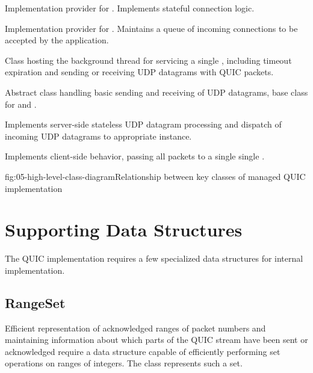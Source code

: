 \begin{itemize}

  \litem[]{\ManagedQuicConnection{}} Implementation provider for \QuicConnection{}. Implements
stateful connection logic.

  \litem[]{\ManagedQuicListener{}} Implementation provider for \QuicListener{}. Maintains a queue of
incoming connections to be accepted by the application.

  \litem[]{\QuicConnectionContext{}} Class hosting the background thread for servicing a single
\ManagedQuicConnection{}, including timeout expiration and sending or receiving UDP datagrams with
QUIC packets.

  \litem[]{\QuicSocketContext{}} Abstract class handling basic sending and receiving of UDP
datagrams, base class for \QuicClientSocketContext{} and \QuicServerSocketContext{}.

  \litem[]{\QuicServerSocketContext{}} Implements server-side stateless UDP datagram processing and
dispatch of incoming UDP datagrams to appropriate \QuicConnectionContext{} instance.

  \litem[]{\QuicClientSocketContext{}} Implements client-side \QuicSocketContext{} behavior, passing
all packets to a single single \QuicConnectionContext{}.

\end{itemize}

\begin{myFigure}{fig:05-high-level-class-diagram}{Relationship between key classes of managed QUIC
implementation}

\resizebox{\linewidth}{!}{}

\end{myFigure}

\section{Supporting Data Structures}

The QUIC implementation requires a few specialized data structures for internal implementation.

\subsection{RangeSet}

Efficient representation of acknowledged ranges of packet numbers and maintaining information about
which parts of the QUIC stream have been sent or acknowledged require a data structure capable of
efficiently performing set operations on ranges of integers. The \RangeSet{} class represents such a
set.

